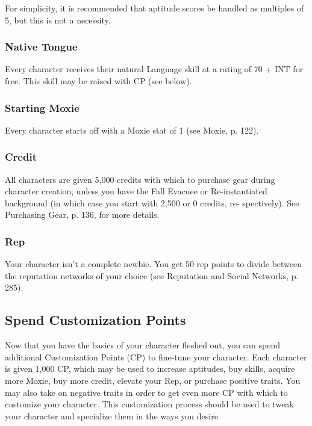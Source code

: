 For simplicity, it is recommended that aptitude scores be handled as multiples of 5, but this is not a necessity. 

\subsubsection{Native Tongue} \label{sec:native-tongue} 

Every character receives their natural Language skill at a rating of 70 + INT for free. This skill may be raised with CP (see below). 

\subsubsection{Starting Moxie} \label{sec:starting-moxie} 

Every character starts off with a Moxie stat of 1 (see Moxie, p. 122). 

\subsubsection{Credit} \label{sec:starting-credit} 

All characters are given 5,000 credits with which to purchase gear during character creation, unless you have the Fall Evacuee or Re-instantiated background (in which case you start with 2,500 or 0 credits, re- spectively). See Purchasing Gear, p. 136, for more details. 

\subsubsection{Rep} \label{sec:starting-rep} Your character isn’t a complete newbie. You get 50 rep points to divide between the reputation networks of your choice (see Reputation and Social Networks, p. 285). 

\subsection{Spend Customization Points} \label{sec:spend-customization-points} Now that you have the basics of your character fleshed out, you can spend additional Customization Points (CP) to fine-tune your character. Each character is given 1,000 CP, which may be used to increase aptitudes, buy skills, acquire more Moxie, buy more credit, elevate your Rep, or purchase positive traits. You may also take on negative traits in order to get even more CP with which to customize your character. This customization process should be used to tweak your character and specialize them in the ways you desire. 

